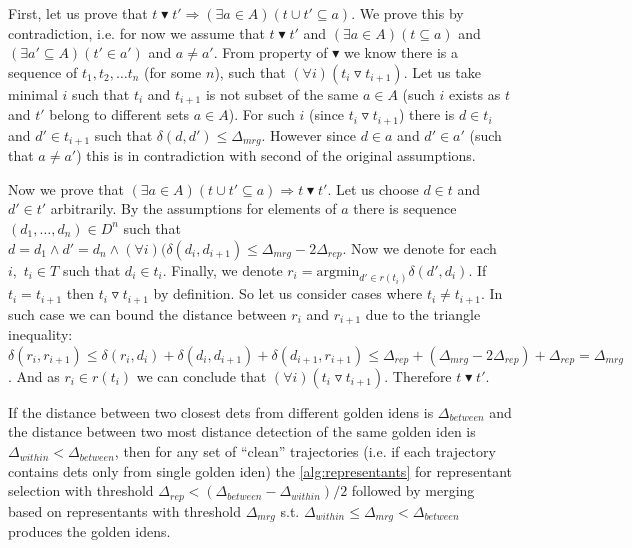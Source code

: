 \begin{myproof}
First, let us prove that $t \blacktriangledown t' \Rightarrow (\exists a \in A) (t \cup t' \subseteq a)$. We prove this by contradiction, i.e. for now we assume
that $t \blacktriangledown t'$ and $(\exists a \in A) (t \subseteq a)$ and $(\exists a' \subseteq A) (t' \in a')$ and $a \neq a'$. From property of $\blacktriangledown$ we know there is a sequence of $t_1, t_2, \ldots t_n$ (for some $n$), such that $(\forall i) (t_i \triangledown t_{i+1})$. Let
us take minimal $i$ such that $t_i$ and $t_{i+1}$ is not subset of the same
$a \in A$ (such $i$ exists as $t$ and $t'$ belong to different sets $a \in A$).
For such $i$ (since $t_i \triangledown t_{i+1}$) there is $d \in t_i$ and
$d' \in t_{i+1}$ such that $\delta(d, d') \leq \Delta_{mrg}$. However since $d \in a$
and $d' \in a'$ (such that $a \neq a'$) this is in contradiction with second
of the original assumptions.

Now we prove that $(\exists a \in A) (t \cup t' \subseteq a) \Rightarrow t \blacktriangledown t'$. Let us choose $d \in t$ and $d' \in t'$ arbitrarily. By the
assumptions for elements of $a$ there is sequence $(d_1, \ldots, d_n) \in D^n$
such that $d = d_1 \land d' = d_n \land (\forall i) (\delta(d_i, d_{i+1}) \leq \Delta_{mrg} - 2\Delta_{rep}$. Now we denote for each $i,$ $t_i \in T$ such that
$d_i \in t_i$. Finally, we denote $r_i = \mathrm{argmin}_{d' \in r(t_i)} \delta(d', d_i)$. If $t_i = t_{i+1}$ then $t_i \triangledown t_{i+1}$ by definition.
So let us consider cases where $t_i \neq t_{i+1}$. In such case we can bound
the distance between $r_i$ and $r_{i+1}$ due to the triangle inequality:
$\delta(r_i, r_{i+1}) \leq \delta(r_i, d_i) + \delta(d_i, d_{i+1}) + \delta(d_{i+1}, r_{i+1}) \leq \Delta_{rep} + (\Delta_{mrg} - 2\Delta_{rep}) + \Delta_{rep} = \Delta_{mrg}$. And as $r_i \in r(t_i)$ we can conclude that $(\forall i) (t_i \triangledown t_{i+1})$. Therefore $t \blacktriangledown t'$.\end{myproof}


\begin{cor}
If the distance between two closest \glspl{det} from different golden
\glspl{iden} is $\Delta_{between}$ and the distance between two most distance detection
of the same golden \gls{iden} is $\Delta_{within} < \Delta_{between}$, then for any set of ``clean''
trajectories (i.e. if each trajectory contains \glspl{det} only from single
golden \gls{iden}) the \autoref{alg:representants} for representant selection
with threshold $\Delta_{rep} < (\Delta_{between} - \Delta_{within}) / 2$ followed by merging based on representants with
threshold $\Delta_{mrg}$ s.t. $\Delta_{within} \leq \Delta_{mrg} < \Delta_{between}$ produces the golden \glspl{iden}.
\end{cor}

